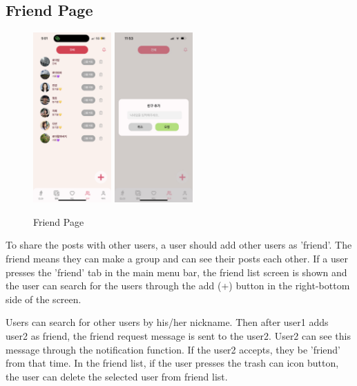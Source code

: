\documentclass[conference]{IEEEtran}
\begin{document}
    \subsection{Friend Page}
        \begin{figure}[htbp]
            \centerline{
            \includegraphics[width=3cm]{Images/page/friends.png}
            \includegraphics[width=3cm]{Images/page/addFriend.jpg}}
            \caption{Friend Page}
            \label{fig}
        \end{figure}
        To share the posts with other users, a user should add other users as 'friend'. The friend means they can make a group and can see their posts each other. If a user presses the 'friend' tab in the main menu bar, the friend list screen is shown and the user can search for the users through the add (+) button in the right-bottom side of the screen.

        Users can search for other users by his/her nickname. Then after user1 adds user2 as friend, the friend request message is sent to the user2. User2 can see this message through the notification function. If the user2 accepts, they be 'friend' from that time. In the friend list, if the user presses the trash can icon button, the user can delete the selected user from friend list.
\end{document}
